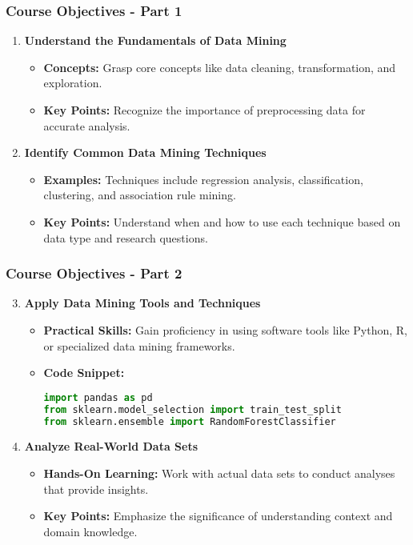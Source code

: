 \documentclass[aspectratio=169]{beamer}
\begin{document}
\begin{frame}[fragile]
    \frametitle{Course Objectives - Part 1}
    \begin{enumerate}
        \item \textbf{Understand the Fundamentals of Data Mining}
        \begin{itemize}
            \item \textbf{Concepts:} Grasp core concepts like data cleaning, transformation, and exploration.
            \item \textbf{Key Points:} Recognize the importance of preprocessing data for accurate analysis.
        \end{itemize}
        
        \item \textbf{Identify Common Data Mining Techniques}
        \begin{itemize}
            \item \textbf{Examples:} Techniques include regression analysis, classification, clustering, and association rule mining.
            \item \textbf{Key Points:} Understand when and how to use each technique based on data type and research questions.
        \end{itemize}
    \end{enumerate}
\end{frame}

\begin{frame}[fragile]
    \frametitle{Course Objectives - Part 2}
    \begin{enumerate} \setcounter{enumi}{2}
        \item \textbf{Apply Data Mining Tools and Techniques}
        \begin{itemize}
            \item \textbf{Practical Skills:} Gain proficiency in using software tools like Python, R, or specialized data mining frameworks.
            \item \textbf{Code Snippet:}
            \begin{lstlisting}[language=Python]
import pandas as pd
from sklearn.model_selection import train_test_split
from sklearn.ensemble import RandomForestClassifier
            \end{lstlisting}
        \end{itemize}

        \item \textbf{Analyze Real-World Data Sets}
        \begin{itemize}
            \item \textbf{Hands-On Learning:} Work with actual data sets to conduct analyses that provide insights.
            \item \textbf{Key Points:} Emphasize the significance of understanding context and domain knowledge.
        \end{itemize}
    \end{enumerate}
\end{frame}
\end{document}
